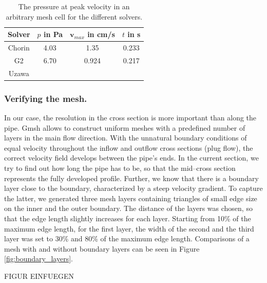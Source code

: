 \begin{table}\begin{center}
    \begin{tabular}{ | c | c | c | c |}
    \hline
    Solver & $p$ in Pa & $\mathbf{v}_{max}$ in cm/s  & $t$ in s \\ \hline\hline
	Chorin & 4.03 & 1.35 & 0.233 	\\ \hline
	G2	&	6.70 & 0.924 & 0.217	\\ \hline
	Uzawa	&	& 		&\\	
    \hline
    \end{tabular}
	\label{tab:solvers}
	\caption{The pressure at peak velocity in an arbitrary mesh cell for the different solvers.}
\end{center}\end{table}


\subsubsection{Verifying the mesh.}
In our case, the resolution in the cross section is more important than along the pipe. Gmsh allows to construct uniform meshes with a predefined number of layers in the main flow direction. With the unnatural boundary conditions of equal velocity throughout the inflow and outflow cross sections (plug flow), the correct velocity field develops between the pipe's ends. In the current section, we try to find out how long the pipe has to be, so that the mid--cross section represents the fully developed profile. Further, we know that there is a boundary layer close to the boundary, characterized by a steep velocity gradient. To capture the latter, we generated three mesh layers containing triangles of small edge size on the inner and the outer boundary. The distance of the layers was chosen, so that the edge length slightly increases for each layer. Starting from 10\% of the maximum edge length, for the first layer, the width of the second and the third layer was set to 30\% and 80\% of the maximum edge length. Comparisons of a mesh with and without boundary layers can be seen in Figure \ref{fig:boundary_layers}.


FIGUR EINFUEGEN




